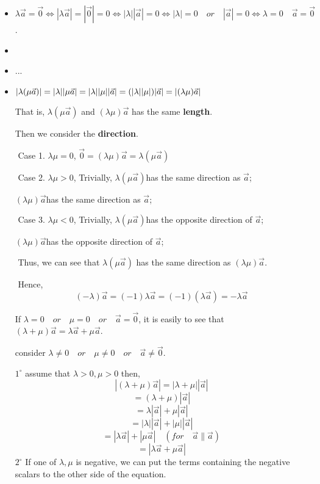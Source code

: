 \documentclass[UTF8]{ctexart}
\begin{document}
\begin{itemize}



\item $\lambda \vec a  = \vec  0  \iff |\lambda \vec a | = |\vec 0 | =0 \iff |\lambda||\vec  a|=0 \iff |\lambda |=0 \quad or \quad |\vec a|=0\iff \lambda =0 \quad \vec  a = \vec 0 $.
\item 
\item  ...
\item $|\lambda (\mu \vec a )|= |\lambda ||\mu \vec  a |\\= |\lambda||\mu||\vec  a |\\= (|\lambda ||\mu|)|\vec a|\\= |(\lambda \mu)\vec a|$

That is, $\lambda (\mu \vec  a )$ and $(\lambda \mu )\vec a$ has the same \textbf{length}.

Then we consider the \textbf{direction}.

​	Case 1. $\lambda \mu=0$, $ \vec 0 =(\lambda \mu )\vec  a= \lambda (\mu \vec a )$

​	Case 2. $\lambda \mu >0$, Trivially, $\lambda (\mu \vec  a )$has the same direction as $\vec  a $;

​												$(\lambda \mu) \vec  a$has the same direction as $\vec  a$;											

​	Case 3. $\lambda \mu <0$, Trivially, $\lambda (\mu \vec  a )$has the opposite direction of $\vec  a $;

​												$(\lambda \mu) \vec  a$has the opposite direction of $\vec  a $;			

​	Thus, we can see that $\lambda (\mu \vec  a )$ has the same direction as $(\lambda \mu) \vec  a $.

​	Hence, 
$$
(- \lambda )\vec a  =  (-1)\lambda \vec a  = (-1)(\lambda \vec a)= -\lambda \vec a 
$$

If $\lambda =0 \quad or\quad  \mu =0 \quad or \quad \vec a =\vec 0 $, it is easily to see that $(\lambda + \mu )\vec  a = \lambda \vec a  + \mu \vec a$.

consider $\lambda \neq 0 \quad or\quad  \mu \neq 0 \quad or \quad \vec a \neq \vec 0 $.

​	$1^{\circ}$  assume that $\lambda >0 , \mu >0 $ then,
$$
|(\lambda + \mu)\vec a |= |\lambda +\mu ||\vec a | 
$$
$$
= (\lambda +\mu )|\vec a | 
$$
$$
= \lambda |\vec a |+\mu |\vec a | 
$$
$$
= |\lambda||\vec a| + |\mu | |\vec  a |
$$
$$
= |\lambda \vec a | + |\mu \vec a |\quad (for \quad  \vec a \parallel \vec a) 
$$
$$
= |\lambda \vec a +\mu \vec a |
$$
​	$2^{\circ}$  If one of  $\lambda ,\mu $ is negative, we can put the terms containing the negative scalars to the other side of the equation.


\end{itemize}
\end{document}
